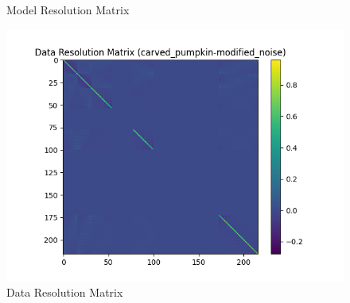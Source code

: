 \documentclass{article}
\begin{document}
\begin{itemize}
\begin{figure}[h]
        \caption{Model Resolution Matrix}
    \end{figure}
    \begin{figure}[h]
        \centering
        \includegraphics[width=1\textwidth]{images/outputs/datares/carved_pumpkin-modified_noise.png}
        \caption{Data Resolution Matrix}
    \end{figure}
    \clearpage



\end{itemize}
\end{document}
